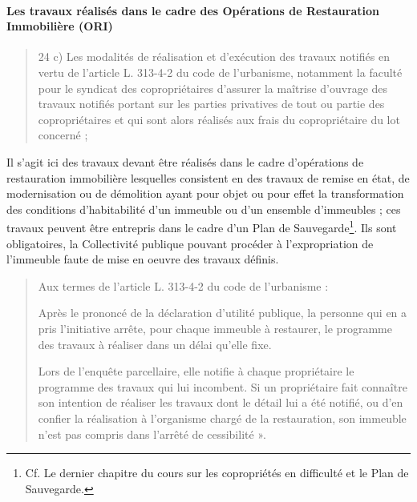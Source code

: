 			\paragraph{Les travaux réalisés dans le cadre des Opérations de Restauration Immobilière (ORI)}
			
				\begin{quote}
					24 c) Les modalités de réalisation et d'exécution des travaux notifiés en vertu de l'article L. 313-4-2 du code de l'urbanisme, notamment la faculté pour le syndicat des copropriétaires d'assurer la maîtrise d'ouvrage des travaux notifiés portant sur les parties privatives de tout ou partie des copropriétaires et qui sont alors réalisés aux frais du copropriétaire du lot concerné ;
				\end{quote}
			
				Il s’agit ici des travaux devant être réalisés dans le cadre d’opérations de restauration immobilière lesquelles consistent en des travaux de remise en état, de modernisation ou de démolition ayant pour objet ou pour effet la transformation des conditions d'habitabilité d'un immeuble ou d'un ensemble d'immeubles ; ces travaux peuvent être entrepris dans le cadre d’un Plan de Sauvegarde\footnote{Cf. Le dernier chapitre du cours sur les copropriétés en difficulté et le Plan de Sauvegarde.}. Ils sont obligatoires, la Collectivité publique pouvant procéder à l’expropriation de l’immeuble faute de mise en oeuvre des travaux définis.
				
				\begin{quote}
					Aux termes de l’article L. 313-4-2 du code de l’urbanisme :
					
					Après le prononcé de la déclaration d'utilité publique, la personne qui en a pris l'initiative arrête, pour chaque immeuble à restaurer, le programme des travaux à réaliser dans un délai qu'elle fixe.
					
					Lors de l'enquête parcellaire, elle notifie à chaque propriétaire le programme des travaux qui lui incombent. Si un propriétaire fait connaître son intention de réaliser les travaux dont le détail lui a été notifié, ou d'en confier la réalisation à l'organisme chargé de la restauration, son immeuble n'est pas compris dans l'arrêté de cessibilité ».
				\end{quote}
				
